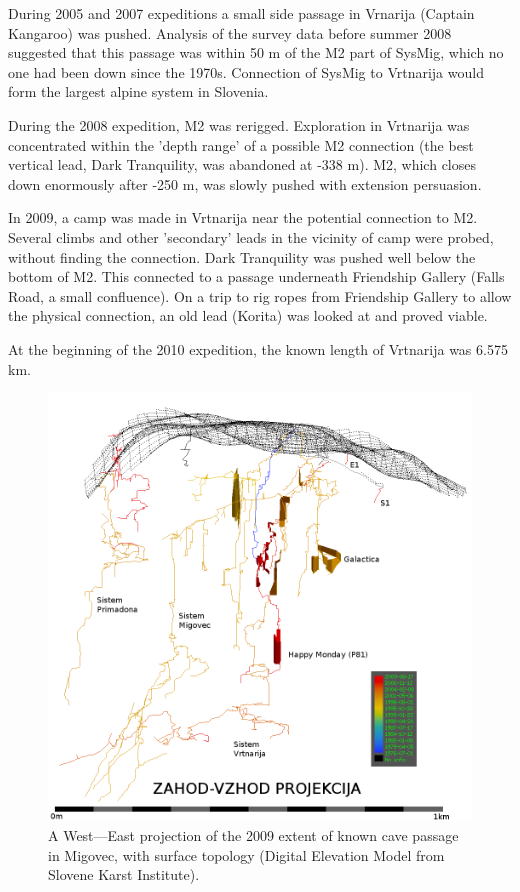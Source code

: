 \documentclass[english,a4]{article}
\begin{document}
During 2005 and 2007 expeditions a small side passage in Vrnarija
(Captain Kangaroo) was pushed. Analysis of the survey data before
summer 2008 suggested that this passage was within 50 m of the M2
part of SysMig, which no one had been down since the 1970s. Connection
of SysMig to Vrtnarija would form the largest alpine system in Slovenia.

During the 2008 expedition, M2 was rerigged. Exploration in Vrtnarija
was concentrated within the 'depth range' of a possible M2 connection
(the best vertical lead, Dark Tranquility, was abandoned at -338 m).
M2, which closes down enormously after -250 m, was slowly pushed with
extension persuasion. 

In 2009, a camp was made in Vrtnarija near the potential connection
to M2. Several climbs and other 'secondary' leads in the vicinity
of camp were probed, without finding the connection. Dark Tranquility
was pushed well below the bottom of M2. This connected to a passage underneath
Friendship Gallery (Falls Road, a small confluence). 
On a trip to rig ropes from Friendship Gallery to allow the physical
connection, an old lead (Korita) was looked at and proved viable.

At the beginning of the 2010 expedition, the known length of Vrtnarija
was 6.575 km.

\begin{center}
\begin{figure}
\centering
\includegraphics[width=0.75\columnwidth]{mig_2009_for_jamar}
\caption{A West---East projection of the 2009 extent of known cave passage in Migovec, with surface topology
(Digital Elevation Model from Slovene Karst Institute).}
\end{figure}
\end{center}
\end{document}
